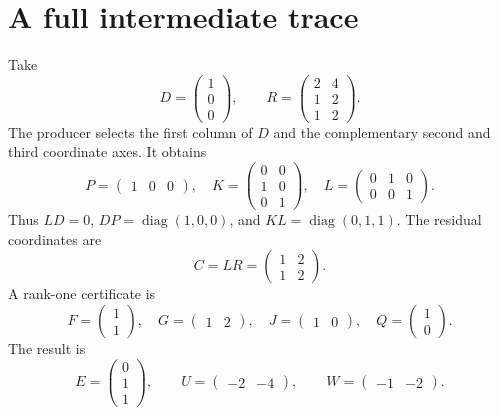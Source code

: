 \documentclass[11pt,letterpaper,oneside,openany]{book}
\theoremstyle{quiet}
\begin{document}
\section{A full intermediate trace}\label{sec:matrix-worked}
Take
\[
 D=\begin{pmatrix}1\\0\\0\end{pmatrix},\qquad
 R=\begin{pmatrix}2&4\\1&2\\1&2\end{pmatrix}.
\]
The producer selects the first column of $D$ and the complementary second and third coordinate axes. It obtains
\[
 P=\begin{pmatrix}1&0&0\end{pmatrix},\quad
 K=\begin{pmatrix}0&0\\1&0\\0&1\end{pmatrix},\quad
 L=\begin{pmatrix}0&1&0\\0&0&1\end{pmatrix}.
\]
Thus $LD=0$, $DP=\operatorname{diag}(1,0,0)$, and $KL=\operatorname{diag}(0,1,1)$. The residual coordinates are
\[
 C=LR=\begin{pmatrix}1&2\\1&2\end{pmatrix}.
\]
A rank-one certificate is
\[
 F=\begin{pmatrix}1\\1\end{pmatrix},\quad
 G=\begin{pmatrix}1&2\end{pmatrix},\quad
 J=\begin{pmatrix}1&0\end{pmatrix},\quad
 Q=\begin{pmatrix}1\\0\end{pmatrix}.
\]
The result is
\[
 E=\begin{pmatrix}0\\1\\1\end{pmatrix},\qquad
 U=\begin{pmatrix}-2&-4\end{pmatrix},\qquad
 W=\begin{pmatrix}-1&-2\end{pmatrix}.
\]
\end{document}
